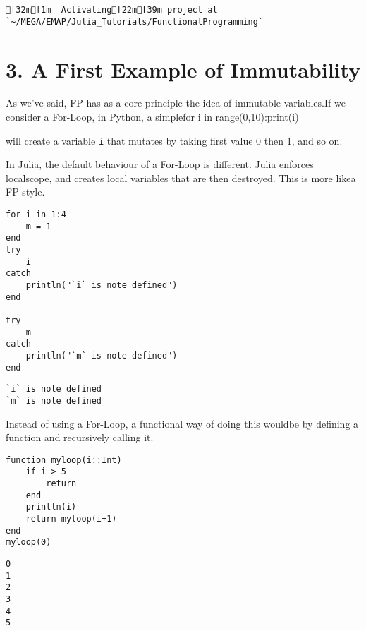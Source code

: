 \begin{verbatim}
[32m[1m  Activating[22m[39m project at `~/MEGA/EMAP/Julia_Tutorials/FunctionalProgramming`

\end{verbatim}

\endgroup

\section{3. A First Example of Immutability}


As we've said, FP has as a core principle the idea of immutable variables.If we consider a For-Loop, in Python, a simple\lstinline[style=julia]{}\lstinline[style=julia]{}for i in range(0,10):print(i)\lstinline[style=julia]{}\lstinline[style=julia]{}

will create a variable \lstinline[style=julia]{i} that mutates by taking first value 0 then 1, and so on.

In Julia, the default behaviour of a For-Loop is different. Julia enforces localscope, and creates local variables that are then destroyed. This is more likea FP style.
\bigskip
\begin{lstlisting}[language=JuliaLocal, style=julia, texcl=true]
for i in 1:4
    m = 1
end
try
    i
catch
    println("`i` is note defined")
end

try
    m
catch
    println("`m` is note defined")
end
\end{lstlisting}

\begingroup

\fontsize{10pt}{12pt}\selectfont

\begin{verbatim}
`i` is note defined
`m` is note defined

\end{verbatim}

\endgroup
Instead of using a For-Loop, a functional way of doing this wouldbe by defining a function and recursively calling it.
\bigskip
\begin{lstlisting}[language=JuliaLocal, style=julia, texcl=true]
function myloop(i::Int)
    if i > 5
        return
    end
    println(i)
    return myloop(i+1)
end
myloop(0)
\end{lstlisting}

\begingroup

\fontsize{10pt}{12pt}\selectfont

\begin{verbatim}
0
1
2
3
4
5

\end{verbatim}


